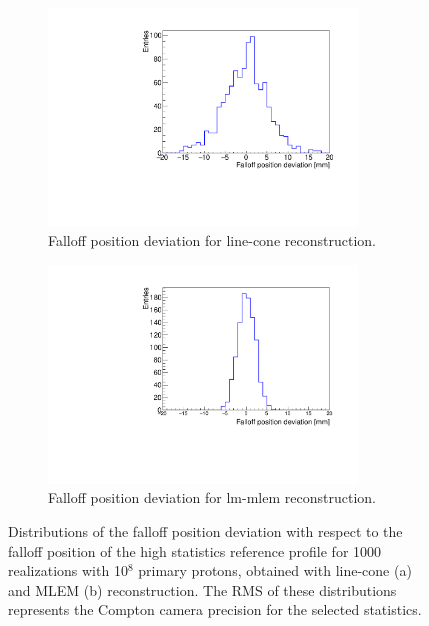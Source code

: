 \begin{figure}
  \centering
   \begin{subfigure}[t]{.49\textwidth}
   \includegraphics[width=0.9\textwidth]{03_GraphicFiles/chapter4_HTsimu/new/LC_histo_deviations.pdf}
   \caption{Falloff position deviation for line-cone reconstruction.}
   \label{fig:fig_Results_Precision_Distribution_Variation_CC_simulation_Hadronth_LC} 
   \end{subfigure}
  \begin{subfigure}[t]{.49\textwidth}
 \includegraphics[width=0.9\textwidth]{03_GraphicFiles/chapter4_HTsimu/new/MLEM_histo_deviations.pdf}
 \caption{Falloff position deviation for \gls{lm-mlem} reconstruction.}
  \label{fig:fig_Results_Precision_Distribution_Variation_CC_simulation_Hadronth_MLEM}
  \end{subfigure}
  \caption{Distributions of the falloff position deviation with respect to the falloff position of the high statistics reference profile for 1000 realizations with 10$^8$ primary protons, obtained with line-cone (a) and MLEM (b) reconstruction. The RMS of these distributions represents the Compton camera precision for the selected statistics.}
  \label{}
  \end{figure}

